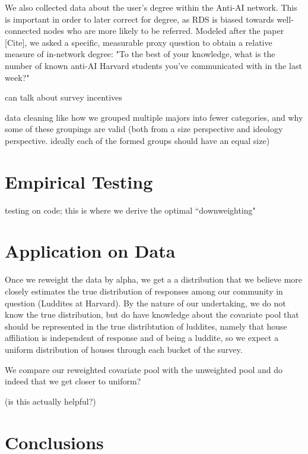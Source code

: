 \documentclass[12pt]{article}
\begin{document}
We also collected data about the user's degree within the Anti-AI network. This is important in order to later correct for degree, as RDS is biased towards well-connected nodes who are more likely to be referred. Modeled after the paper [Cite], we asked a specific, measurable proxy question to obtain a relative measure of in-network degree: "To the best of your knowledge, what is the number of known anti-AI Harvard students you've communicated with in the last week?"

can talk about survey incentives

data cleaning like how we grouped multiple majors into fewer categories, and why some of these groupings are valid (both from a size perspective and ideology perspective. ideally each of the formed groups should have an equal size)

\section{Empirical Testing}
testing on code; this is where we derive the optimal ``downweighting"

\section{Application on Data}

Once we reweight the data by alpha, we get a a distribution that we believe more closely
estimates the true distribution of responses among our community in question (Luddites at Harvard). By the nature of our undertaking, we do not know the true distribution, but do have knowledge about the covariate pool that should be represented in the true distribtution of luddites, namely that house affiliation is independent of response and of being a luddite, so we expect a uniform distribution of houses through each bucket of the survey. 

We compare our reweighted covariate pool with the unweighted pool and do indeed that we get closer to uniform?

(is this actually helpful?)
\section{Conclusions}
\end{document}
